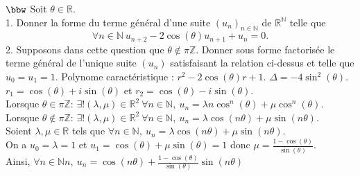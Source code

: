 \documentclass[11pt]{article}
\begin{document}
\begin{exercice}{$\bbw$}{}
    Soit $\theta\in\mathbb{R}$.\\
    1. Donner la forme du terme général d'une suite $(u_n)_{n\in\mathbb{N}}$ de $\mathbb{R}^\mathbb{N}$ telle que
    \begin{equation*}
        \forall n \in \mathbb{N} ~ u_{n+2} - 2\cos(\theta)u_{n+1} + u_n = 0.
    \end{equation*}
    2. Supposons dans cette question que $\theta \notin \pi\mathbb{Z}$. Donner sous forme factorisée le terme général de l'unique suite $(u_n)$ satisfaisant la relation ci-dessus et telle que $u_0=u_1=1$.
    \tcblower
     Polynome caractéristique : $r^2 - 2\cos(\theta)r + 1$. $\Delta = -4\sin^2(\theta)$. $r_1 = \cos(\theta) + i\sin(\theta)$ et $r_2 = \cos(\theta) - i\sin(\theta)$.\\
    Lorsque $\theta\in\pi\mathbb{Z}$: $\exists!(\lambda,\mu)\in\mathbb{R}^2 ~ \forall n\in\mathbb{N}, ~ u_n = \lambda n \cos^n(\theta) + \mu \cos^n(\theta)$.\\
    Lorsque $\theta\notin\pi\mathbb{Z}$: $\exists!(\lambda,\mu)\in\mathbb{R}^2 ~ \forall n\in\mathbb{N}, ~ u_n = \lambda \cos(n\theta) + \mu\sin(n\theta)$.\\
     Soient $\lambda,\mu\in\mathbb{R}$ tels que $\forall n\in\mathbb{N}, ~ u_n = \lambda\cos(n\theta)+\mu\sin(n\theta)$.\\
    On a $u_0 = \lambda = 1$ et $u_1 = \cos(\theta) + \mu\sin(\theta) = 1$ donc $\mu = \frac{1-\cos(\theta)}{\sin(\theta)}$.\\
    Ainsi, $\forall n\in\mathbb{N}n, ~ u_n = \cos(n\theta) + \frac{1-\cos(\theta)}{\sin(\theta)}\sin(n\theta)$
\end{exercice}
\end{document}
